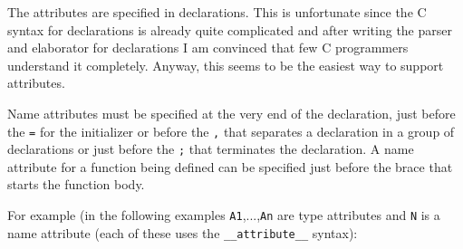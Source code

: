 \documentclass[letterpaper]{article}
\def\t#1{{\tt #1}}
\begin{document}
 The attributes are specified in declarations. This is unfortunate since the C
syntax for declarations is already quite complicated and after writing the
parser and elaborator for declarations I am convinced that few C programmers
understand it completely. Anyway, this seems to be the easiest way to support
attributes.

 Name attributes must be specified at the very end of the declaration, just
before the \t{=} for the initializer or before the \t{,} that separates a
declaration in a group of declarations or just before the \t{;} that
terminates the declaration. A name attribute for a function being defined can
be specified just before the brace that starts the function body.

 For example (in the following examples \t{A1},...,\t{An} are type attributes
and \t{N} is a name attribute (each of these uses the \t{\_\_attribute\_\_} syntax):

\end{document}
